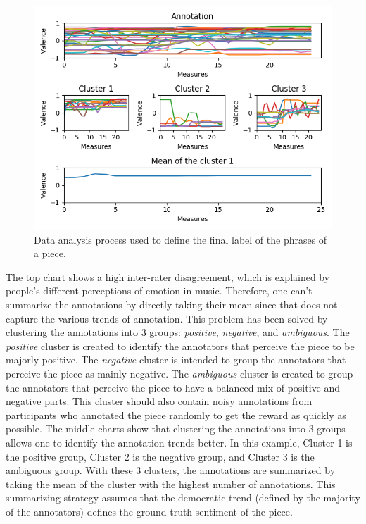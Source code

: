 \begin{figure}[!h]
 \centering
 \includegraphics[width=0.9\columnwidth]{imgs/ismir19/clustering.png}
 \caption{Data analysis process used to define the final label of the phrases of a piece. }
 \label{fig:clustering}
\end{figure}

The top chart shows a high inter-rater disagreement, which is explained by people's different perceptions of emotion in music. Therefore, one can't summarize the annotations by directly taking their mean since that does not capture the various trends of annotation. This problem has been solved by clustering the annotations into 3 groups: \textit{positive}, \textit{negative}, and \textit{ambiguous}. The \textit{positive} cluster is created to identify the annotators that perceive the piece to be majorly positive. The \textit{negative} cluster is intended to group the annotators that perceive the piece as mainly negative. The \textit{ambiguous} cluster is created to group the annotators that perceive the piece to have a balanced mix of positive and negative parts. This cluster should also contain noisy annotations from participants who annotated the piece randomly to get the reward as quickly as possible. The middle charts show that clustering the annotations into 3 groups allows one to identify the annotation trends better. In this example, Cluster 1 is the positive group, Cluster 2 is the negative group, and Cluster 3 is the ambiguous group. With these 3 clusters, the annotations are summarized by taking the mean of the cluster with the highest number of annotations. This summarizing strategy assumes that the democratic trend (defined by the majority of the annotators) defines the ground truth sentiment of the piece.

